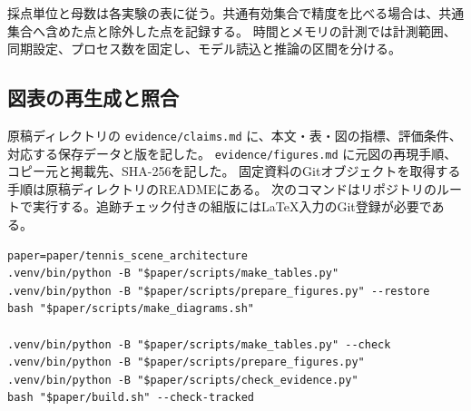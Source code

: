 採点単位と母数は各実験の表に従う。共通有効集合で精度を比べる場合は、共通集合へ含めた点と除外した点を記録する。
時間とメモリの計測では計測範囲、同期設定、プロセス数を固定し、モデル読込と推論の区間を分ける。

\subsection{図表の再生成と照合}

原稿ディレクトリの \texttt{evidence/claims.md} に、本文・表・図の指標、評価条件、対応する保存データと版を記した。
\texttt{evidence/figures.md} に元図の再現手順、コピー元と掲載先、SHA-256を記した。
固定資料のGitオブジェクトを取得する手順は原稿ディレクトリのREADMEにある。
次のコマンドはリポジトリのルートで実行する。追跡チェック付きの組版にはLaTeX入力のGit登録が必要である。

\begin{verbatim}
paper=paper/tennis_scene_architecture
.venv/bin/python -B "$paper/scripts/make_tables.py"
.venv/bin/python -B "$paper/scripts/prepare_figures.py" --restore
bash "$paper/scripts/make_diagrams.sh"

.venv/bin/python -B "$paper/scripts/make_tables.py" --check
.venv/bin/python -B "$paper/scripts/prepare_figures.py"
.venv/bin/python -B "$paper/scripts/check_evidence.py"
bash "$paper/build.sh" --check-tracked
\end{verbatim}
